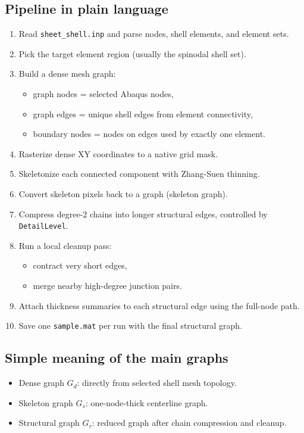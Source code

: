 \documentclass[11pt]{article}
\begin{document}
\subsection*{Pipeline in plain language}
\begin{enumerate}
  \item Read \texttt{sheet\_shell.inp} and parse nodes, shell elements, and element sets.
  \item Pick the target element region (usually the spinodal shell set).
  \item Build a dense mesh graph:
  \begin{itemize}
    \item graph nodes = selected Abaqus nodes,
    \item graph edges = unique shell edges from element connectivity,
    \item boundary nodes = nodes on edges used by exactly one element.
  \end{itemize}
  \item Rasterize dense XY coordinates to a native grid mask.
  \item Skeletonize each connected component with Zhang-Suen thinning.
  \item Convert skeleton pixels back to a graph (skeleton graph).
  \item Compress degree-2 chains into longer structural edges, controlled by \texttt{DetailLevel}.
  \item Run a local cleanup pass:
  \begin{itemize}
    \item contract very short edges,
    \item merge nearby high-degree junction pairs.
  \end{itemize}
  \item Attach thickness summaries to each structural edge using the full-node path.
  \item Save one \texttt{sample.mat} per run with the final structural graph.
\end{enumerate}

\subsection*{Simple meaning of the main graphs}
\begin{itemize}
  \item Dense graph $G_d$: directly from selected shell mesh topology.
  \item Skeleton graph $G_s$: one-node-thick centerline graph.
  \item Structural graph $G_r$: reduced graph after chain compression and cleanup.
\end{itemize}
\end{document}

